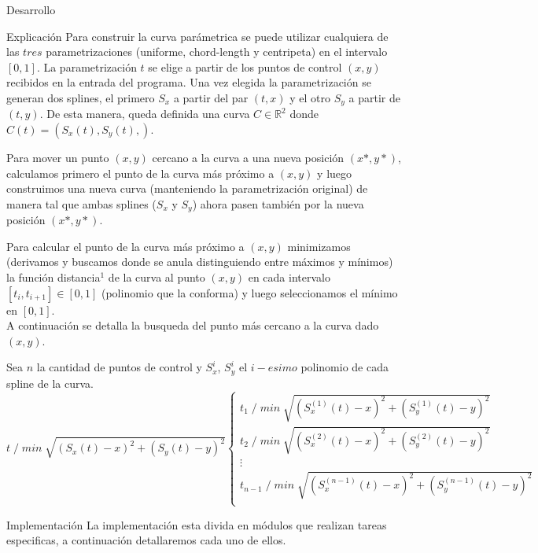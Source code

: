 \begin{section}{Desarrollo}
	\begin{subsection}{Explicación}
		Para construir la curva parámetrica se puede utilizar cualquiera de las $tres$ parametrizaciones (uniforme, chord-length y centripeta) en el intervalo
		$[0,1]$.
		La parametrización $t$ se elige a partir de los puntos de control $(x,y)$ recibidos en la entrada del programa.
		Una vez elegida la parametrización se generan dos splines, el primero $S_x$ a partir del par $(t,x)$ y el otro $S_y$ a partir de $(t,y)$.
		De esta manera, queda definida una curva $C \in \mathbb{R}^2$ donde $C(t) = (S_x(t),S_y(t),)$.
		
		Para mover un punto $(x,y)$ cercano a la curva a una nueva posición $(x*,y*)$, calculamos primero el punto de la curva más próximo a $(x,y)$ y luego
		construimos una nueva curva (manteniendo la parametrización original) de manera tal que ambas splines ($S_x$ y $S_y$) ahora pasen también por la nueva posición $(x*,y*)$.
		
		Para calcular el punto de la curva más próximo a $(x,y)$ minimizamos (derivamos y buscamos donde se anula distinguiendo entre máximos y mínimos) la 
		función distancia$^1$ de la curva al punto $(x,y)$ en cada intervalo
		$[t_i,t_{i+1}] \in [0,1]$ (polinomio que la conforma) y luego seleccionamos el mínimo en $[0,1]$.\\
		
		A continuación se detalla la busqueda del punto más cercano a la curva dado $(x,y)$.
		
		Sea $n$ la cantidad de puntos de control y $S_x^i$, $S_y^i$ el $i-esimo$ polinomio de cada spline de la curva.\\
		
		 
		$t \; /\; min\; \sqrt{(S_x(t)-x)^2+(S_y(t)-y)^2} \left\{
		\begin{array}{c}
		t_1\; /\; min\; \sqrt{(S_x^{(1)}(t)-x)^2+(S_y^{(1)}(t)-y)^2}\\
		t_2\; /\; min\; \sqrt{(S_x^{(2)}(t)-x)^2+(S_y^{(2)}(t)-y)^2}\\
		\vdots\\
		t_{n-1}\; /\; min\; \sqrt{(S_x^{(n-1)}(t)-x)^2+(S_y^{(n-1)}(t)-y)^2}\\
		\end{array}
		\right.$
		\VSP		
	\end{subsection}
	\begin{subsection}{Implementación}
		La implementación esta divida en módulos que realizan tareas especificas, a continuación detallaremos cada uno de ellos.
		

\end{subsection}
\end{section}

